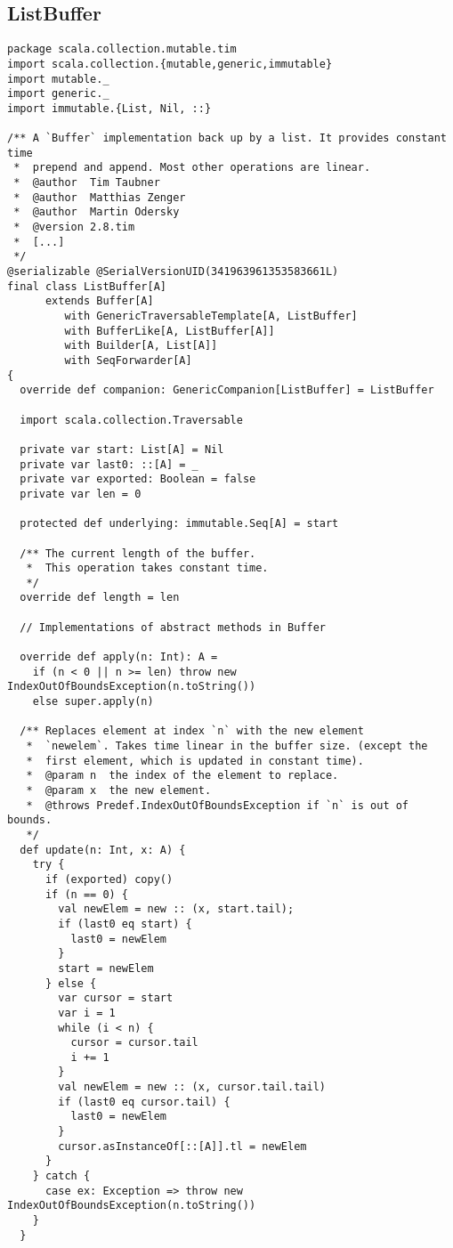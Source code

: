 \subsection{ListBuffer}
\begin{lstlisting}
package scala.collection.mutable.tim
import scala.collection.{mutable,generic,immutable}
import mutable._
import generic._
import immutable.{List, Nil, ::}

/** A `Buffer` implementation back up by a list. It provides constant time
 *  prepend and append. Most other operations are linear.
 *  @author  Tim Taubner
 *  @author  Matthias Zenger
 *  @author  Martin Odersky
 *  @version 2.8.tim
 *  [...]
 */
@serializable @SerialVersionUID(341963961353583661L)
final class ListBuffer[A]
      extends Buffer[A]
         with GenericTraversableTemplate[A, ListBuffer]
         with BufferLike[A, ListBuffer[A]]
         with Builder[A, List[A]]
         with SeqForwarder[A]
{
  override def companion: GenericCompanion[ListBuffer] = ListBuffer

  import scala.collection.Traversable

  private var start: List[A] = Nil
  private var last0: ::[A] = _
  private var exported: Boolean = false
  private var len = 0

  protected def underlying: immutable.Seq[A] = start

  /** The current length of the buffer.
   *  This operation takes constant time.
   */
  override def length = len

  // Implementations of abstract methods in Buffer

  override def apply(n: Int): A =
    if (n < 0 || n >= len) throw new IndexOutOfBoundsException(n.toString())
    else super.apply(n)

  /** Replaces element at index `n` with the new element
   *  `newelem`. Takes time linear in the buffer size. (except the
   *  first element, which is updated in constant time).
   *  @param n  the index of the element to replace.
   *  @param x  the new element.
   *  @throws Predef.IndexOutOfBoundsException if `n` is out of bounds.
   */
  def update(n: Int, x: A) {
    try {
      if (exported) copy()
      if (n == 0) {
        val newElem = new :: (x, start.tail);
        if (last0 eq start) {
          last0 = newElem
        }
        start = newElem
      } else {
        var cursor = start
        var i = 1
        while (i < n) {
          cursor = cursor.tail
          i += 1
        }
        val newElem = new :: (x, cursor.tail.tail)
        if (last0 eq cursor.tail) {
          last0 = newElem
        }
        cursor.asInstanceOf[::[A]].tl = newElem
      }
    } catch {
      case ex: Exception => throw new IndexOutOfBoundsException(n.toString())
    }
  }


\end{lstlisting}
